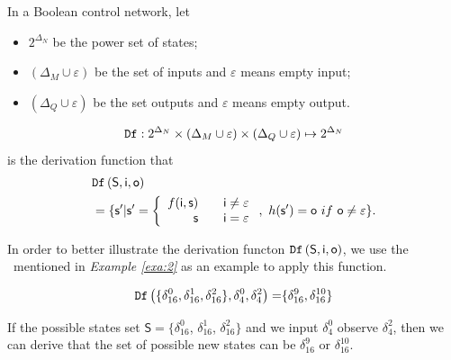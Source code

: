 \begin{definition} 
In a Boolean control network, let
\begin{itemize}
\item $2^{\Delta_N}$ be the power set of states; 
\item $(\Delta_M\cup\varepsilon)$ be the set of inputs and $\varepsilon$ means empty input; 
\item $(\Delta_Q\cup\varepsilon)$ be the set outputs and $\varepsilon$ means empty output.
\end{itemize} 

\[{\tt Df}:2^{\Delta_N}\times (\Delta_M\cup\varepsilon) \times (\Delta_Q\cup\varepsilon) \mapsto 2^{\Delta_N}\] 
is the derivation function that
\begin{equation*}
\begin{split}
&{\tt Df}\left( \mathsf{S},  \mathsf{i},  \mathsf{o}\right)\\
&=\{ \mathsf{s}'| \mathsf{s}'=\left\{
\begin{array}{rcl}
f( \mathsf{i}, \mathsf{s})      &      & {\mathsf{i}\neq \varepsilon}\\
\mathsf{s}       &      & {\mathsf{i}= \varepsilon}
\end{array} \right. ,\ h(\mathsf{s}')=\mathsf{o}\ if\ \mathsf{o}\neq \varepsilon\}.
\end{split}
\end{equation*}

\end{definition}

\begin{example}
 In order to better illustrate the derivation functon ${\tt Df}\left( \mathsf{S},  \mathsf{i},  \mathsf{o}\right)$, we use the \BCN\ mentioned in {\em Example \ref{exa:2}} as an example to apply this function. 
 
 \begin{equation*}
\begin{split}
{\tt Df}\left(\{\delta_{16}^0,\delta_{16}^1,\delta_{16}^2\},\delta_4^0,\delta_4^2\right)=&\{\delta_{16}^{9},\delta_{16}^{10}\}\\
\end{split}
\label{equ:11}
\end{equation*}

If the possible states set $\mathsf{S}=\{\delta_{16}^0$, $\delta_{16}^1$, $\delta_{16}^2\}$ and we input $\delta_4^0$ observe $\delta_4^2$, then we can derive that the set of possible new states can be $\delta_{16}^{9}$ or  $\delta_{16}^{10}$.
 \label{exa:8}
 \end{example}   
 
